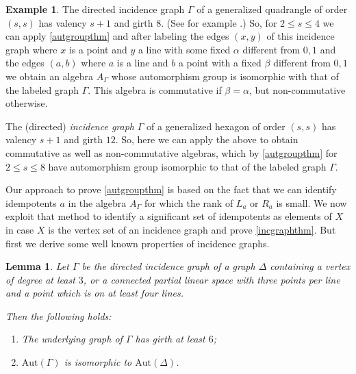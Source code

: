 \documentclass[oneside,a4paper]{amsart} %
\newtheorem{lemma}[proposition]{Lemma}
\theoremstyle{definition}
\newtheorem{example}[proposition]{Example}
\begin{document}
\begin{example}
The directed incidence graph $\Gamma$ of a generalized quadrangle  of order $(s,s)$ has valency $s+1$ and girth $8$. (See for example \cite{drg}.) 
So, for $2\leq s\leq 4$ we can apply \cref{autgroupthm} and after labeling the edges $(x,y)$ of this incidence graph where 
$x$ is a point and $y$ a line with some fixed $\alpha$ different from $0,1$ and the edges $(a,b)$ where $a$ is a line and $b$ a point with a fixed $\beta$
different from $0,1$
we obtain an algebra $A_\Gamma$ whose automorphism group is isomorphic with that of the labeled graph $\Gamma$.
This algebra is commutative if $\beta=\alpha$, but non-commutative otherwise. 

The (directed) \emph{incidence graph} $\Gamma$ of a generalized hexagon  of order $(s,s)$ has valency $s+1$ and girth $12$.
So, here we can apply the above to obtain commutative as well as non-commutative algebras, which by  \cref{autgroupthm} for $2\leq s\leq 8$ have  automorphism group  isomorphic to that of the labeled graph $\Gamma$.
\end{example}


Our approach to prove  \cref{autgroupthm} is based on the fact that we can identify idempotents $a$ in the algebra $A_\Gamma$  for which the
rank of $L_a$ or $R_a$ is small.
We now exploit that method to identify a significant set of idempotents as elements of $X$ in case $X$ is the vertex set of an incidence graph and prove \cref{incgraphthm}.
But first we derive some well known properties of incidence graphs. 

\begin{lemma}\label{iso_of_groups}
Let $\Gamma$ be the directed incidence graph of a graph $\Delta$ containing a vertex of degree at least $3$, or a connected partial linear space with three points per line and a point which is on at least four lines.

Then the following holds:
\begin{enumerate}
\item The underlying graph of $\Gamma$ has girth at least $6$;
\item $\mathrm{Aut}(\Gamma)$ is isomorphic to $\mathrm{Aut}(\Delta)$.
\end{enumerate}
\end{lemma}
\end{document}
